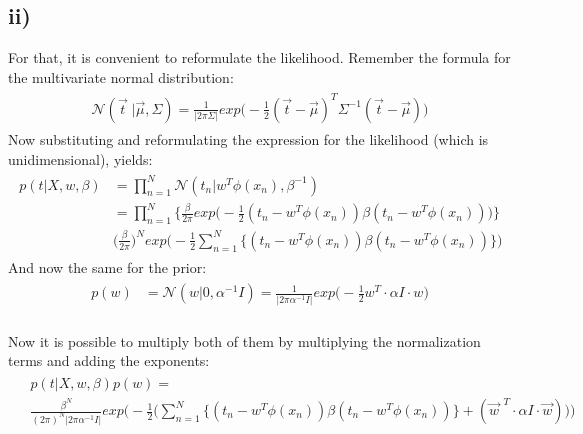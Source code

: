 \documentclass[11pt]{scrartcl} %
\begin{document}
         \subsection*{ii)}
         For that, it is convenient to reformulate the likelihood. Remember the formula for the multivariate normal distribution:         
         \begin{align*}
           \begin{aligned}
             \mathcal{N}(\vec{t}\;|\vec{\mu}, \Sigma) = \frac{1}{|2\pi\Sigma|}exp\Big(-\frac{1}{2}(\vec{t}-\vec{\mu})^T\Sigma^{-1} (\vec{t}-\vec{\mu}) \Big)
           \end{aligned}
         \end{align*}
         Now substituting and reformulating the expression for the likelihood (which is unidimensional), yields:
         \begin{align*}
           \begin{aligned}
             p(t|X,w,\beta) &= \prod_{n=1}^N\mathcal{N}(t_n|w^T\phi(x_n), \beta^{-1})\\  
             &= \prod_{n=1}^N\Bigg\{\frac{\beta}{2\pi}exp\bigg(-\frac{1}{2}(t_n-w^T\phi(x_n))\beta (t_n-w^T\phi(x_n)) \bigg) \Bigg\} \\
             &\Big(\frac{\beta}{2\pi}\Big)^Nexp\bigg(-\frac{1}{2}\sum_{n=1}^N\Big\{(t_n-w^T\phi(x_n))\beta (t_n-w^T\phi(x_n))\Big\} \Bigg)
           \end{aligned}
         \end{align*}
         And now the same for the prior:
         \begin{align*}
           \begin{aligned}
             p(w) &= \mathcal{N}(w|0, \alpha^{-1}I) = \frac{1}{|2\pi\alpha^{-1}I|}exp\bigg(-\frac{1}{2}w^T \cdot \alpha I \cdot w \bigg) \\
           \end{aligned}
         \end{align*}

         Now it is possible to multiply both of them by multiplying the normalization terms and adding the exponents:
         \begin{align*}
           \begin{aligned}
             &p(t|X,w,\beta)p(w) =\\
             &\frac{\beta^N}{(2\pi)^N|2\pi\alpha^{-1}I|}exp\bigg(-\frac{1}{2} \bigg( \sum_{n=1}^N\Big\{(t_n-w^T\phi(x_n))\beta (t_n-w^T\phi(x_n))\Big\} + (\vec{w}^{\;\,T} \cdot \alpha I \cdot \vec{w}) \bigg) \Bigg)
           \end{aligned}
         \end{align*}
\end{document}
